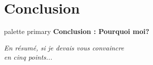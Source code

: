 \documentclass[aspectratio=169,11pt]{beamer}
\begin{document}
\section*{Conclusion}

\begin{frame}{}
  \begin{beamercolorbox}[wd=\paperwidth,ht=1.8cm,dp=0.3cm,center]{palette primary}
    {\large\bfseries Conclusion : Pourquoi moi?}
  \end{beamercolorbox}
  
  \vspace{1.5cm}
  
  \centering
  {\Large\textit{En résumé, si je devais vous convaincre\\en cinq points...}}
  
  \vspace{1em}
  
  {\large{}}
  \vfill
\end{frame}
\end{document}

